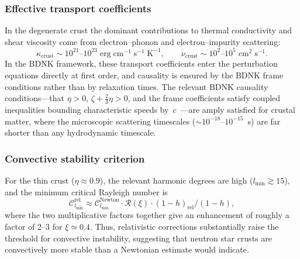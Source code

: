 \subsubsection{Effective transport coefficients}

In the degenerate crust the dominant contributions to thermal
conductivity and shear viscosity come from electron--phonon and
electron--impurity scattering:
\begin{equation}\label{eq:rel-60-34}
\kappa_{\mathrm{crust}} \sim 10^{21}\text{--}10^{23}
  \;\mathrm{erg\;cm^{-1}\;s^{-1}\;K^{-1}},
\qquad
\nu_{\mathrm{crust}} \sim 10^{2}\text{--}10^{5}\;\mathrm{cm^{2}\;s^{-1}}.
\end{equation}
In the BDNK framework, these transport coefficients enter the
perturbation equations directly at first order, and causality is
ensured by the BDNK frame conditions rather than by
relaxation times.  The relevant BDNK causality conditions---that
$\eta > 0$, $\zeta + \tfrac{2}{3}\eta > 0$, and the frame
coefficients satisfy coupled inequalities bounding characteristic
speeds by~$c$~\cite{BemficaDN2018,Kovtun2019,BemficaDNK2023}---are
amply satisfied for crustal matter, where the microscopic scattering
timescales ($\sim 10^{-18}$--$10^{-15}$~s) are far shorter than any
hydrodynamic timescale.

\subsubsection{Convective stability criterion}

For the thin crust ($\eta\approx 0.9$), the relevant harmonic degrees
are high ($l_{\min}\gtrsim 15$), and the minimum critical Rayleigh
number is
\begin{equation}\label{eq:rel-60-35}
\mathcal{C}_{l_{\min}}^{\mathrm{rel}}
  \approx \mathcal{C}_{l_{\min}}^{\mathrm{Newton}}
  \cdot\mathscr{R}(\xi)\cdot(1-h)_{\mathrm{rel}}/(1-h),
\end{equation}
where the two multiplicative factors together give an enhancement of
roughly a factor of 2--3 for $\xi\simeq 0.4$.  Thus, relativistic
corrections substantially raise the threshold for convective
instability, suggesting that neutron star crusts are convectively
more stable than a Newtonian estimate would indicate.

